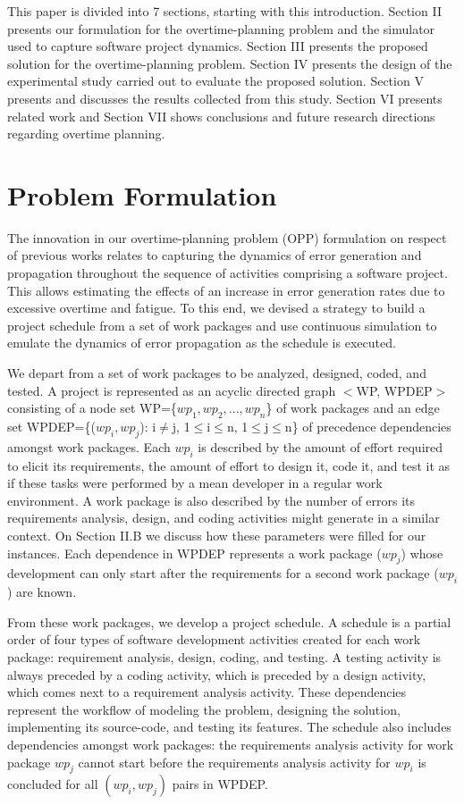 \documentclass[conference]{IEEEtran}
\begin{document}
This paper is divided into 7 sections, starting with this introduction. Section II presents our formulation for the overtime-planning problem and the simulator used to capture software project dynamics. Section III presents the proposed solution for the overtime-planning problem. Section IV presents the design of the experimental study carried out to evaluate the proposed solution. Section V presents and discusses the results collected from this study. Section VI presents related work and Section VII shows conclusions and future research directions regarding overtime planning.

\section{Problem Formulation}
The innovation in our overtime-planning problem (OPP) formulation on respect of previous works relates to capturing the dynamics of error generation and propagation throughout the sequence of activities comprising a software project. This allows estimating the effects of an increase in error generation rates due to excessive overtime and fatigue. To this end, we devised a strategy to build a project schedule from a set of work packages and use continuous simulation to emulate the dynamics of error propagation as the schedule is executed.

We depart from a set of work packages to be analyzed, designed, coded, and tested. A project is represented as an acyclic directed graph $<$WP, WPDEP$>$ consisting of a node set WP=\{$wp_1, wp_2, ..., wp_n$\} of work packages and an edge set WPDEP=\{($wp_i, wp_j$): i$\not=$j, 1$\leq$i$\leq$n, 1$\leq$j$\leq$n\} of precedence dependencies amongst work packages. Each $wp_i$ is described by the amount of effort required to elicit its requirements, the amount of effort to design it, code it, and test it as if these tasks were performed by a mean developer in a regular work environment. A work package is also described by the number of errors its requirements analysis, design, and coding activities might generate in a similar context. On Section II.B we discuss how these parameters were filled for our instances. Each dependence in WPDEP represents a work package ($wp_j$) whose development can only start after the requirements for a second work package ($wp_i$) are known.

From these work packages, we develop a project schedule. A schedule is a partial order of four types of software development activities created for each work package: requirement analysis, design, coding, and testing. A testing activity is always preceded by a coding activity, which is preceded by a design activity, which comes next to a requirement analysis activity. These dependencies represent the workflow of modeling the problem, designing the solution, implementing its source-code, and testing its features. The schedule also includes dependencies amongst work packages: the requirements analysis activity for work package $wp_j$ cannot start before the requirements analysis activity for $wp_i$ is concluded for all $(wp_i, wp_j)$ pairs in WPDEP. 
\end{document}
